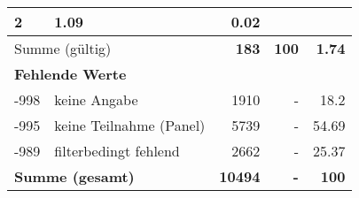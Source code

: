 \begin{longtable}{lXrrr}
       \num{2} &
       \num[round-mode=places,round-precision=2]{1.09} &
         \num[round-mode=places,round-precision=2]{0.02} \\
     \midrule
     \multicolumn{2}{l}{Summe (gültig)} &
       \textbf{\num{183}} &
     \textbf{\num{100}} &
       \textbf{\num[round-mode=places,round-precision=2]{1.74}} \\
     \multicolumn{5}{l}{\textbf{Fehlende Werte}}\\
       -998 &
       keine Angabe &
         \num{1910} &
        - &
         \num[round-mode=places,round-precision=2]{18.2} \\
       -995 &
       keine Teilnahme (Panel) &
         \num{5739} &
        - &
         \num[round-mode=places,round-precision=2]{54.69} \\
       -989 &
       filterbedingt fehlend &
         \num{2662} &
        - &
         \num[round-mode=places,round-precision=2]{25.37} \\
     \midrule
     \multicolumn{2}{l}{\textbf{Summe (gesamt)}} &
          \textbf{\num{10494}} &
        \textbf{-} &
        \textbf{\num{100}} \\
     \bottomrule
     \end{longtable}
     
